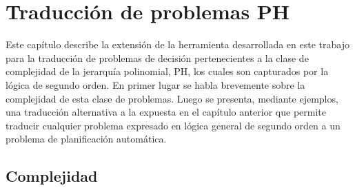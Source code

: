 
\chapter{Traducción de problemas PH}
\label{Chapter3}


Este capítulo describe la extensión de la herramienta desarrollada en este
trabajo para la traducción de problemas de decisión pertenecientes a la clase de
complejidad de la jerarquía polinomial, PH, los cuales son capturados por la lógica de
segundo orden. En primer lugar se habla brevemente sobre la complejidad de esta
clase de problemas. Luego se presenta, mediante ejemplos, una traducción alternativa a la
expuesta en el capítulo anterior que permite traducir cualquier problema
expresado en lógica general de segundo orden a un problema de planificación
automática.

\section{Complejidad}

